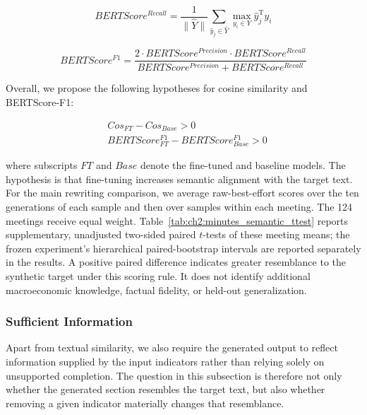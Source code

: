 \begin{equation}\label{eq:ch2:bert_recall}
    BERTScore^{Recall} = \frac{1}{\|\hat{Y}\|}\sum_{\hat{y}_j \in \hat{Y}} \max_{y_i \in Y} \hat{y}_j^{\text{T}}y_i
\end{equation}

\begin{equation}\label{eq:ch2:bert_f1}
    BERTScore^{F1} = \frac{2\cdot BERTScore^{Precision}\cdot BERTScore^{Recall}}{BERTScore^{Precision}+BERTScore^{Recall}}
\end{equation}


Overall, we propose the following hypotheses for cosine similarity and BERTScore-F1:

\begin{equation*}
    \begin{split}
        &Cos_{FT} - Cos_{Base} > 0 \\
        &BERTScore^{F1}_{FT} - BERTScore^{F1}_{Base} > 0
    \end{split}
\end{equation*}


where subscripts $FT$ and $Base$ denote the fine-tuned and baseline models. The hypothesis is that fine-tuning increases semantic alignment with the target text. For the main rewriting comparison, we average raw-best-effort scores over the ten generations of each sample and then over samples within each meeting. The 124 meetings receive equal weight. Table~\ref{tab:ch2:minutes_semantic_ttest} reports supplementary, unadjusted two-sided paired $t$-tests of these meeting means; the frozen experiment's hierarchical paired-bootstrap intervals are reported separately in the results. A positive paired difference indicates greater resemblance to the synthetic target under this scoring rule. It does not identify additional macroeconomic knowledge, factual fidelity, or held-out generalization.




\subsubsection*{Sufficient Information}

Apart from textual similarity, we also require the generated output to reflect information supplied by the input indicators rather than relying solely on unsupported completion. The question in this subsection is therefore not only whether the generated section resembles the target text, but also whether removing a given indicator materially changes that resemblance.


